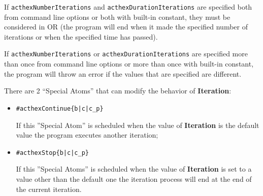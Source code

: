 \documentclass[a4paper, 11pt]{article}
\newcommand{\Iteration}{\textbf{Iteration}\xspace}
\begin{document}
		If \verb|acthexNumberIterations| and \verb|acthexDurationIterations| are specified both from command line options or both with built-in constant, they must be considered in OR (the program will end when it made ​​the specified number of iterations or when the specified time has passed).

		If \verb|acthexNumberIterations| or \verb|acthexDurationIterations| are specified more than once from command line options or more than once with built-in constant, the program will throw an error if the values that are specified are different.

		\vspace*{1em}

		There are 2 ``Special Atoms'' that can modify the behavior of \Iteration:
		\begin{itemize}
			\item \verb+#acthexContinue{b|c|c_p}+

				If this ''Special Atom'' is scheduled when the value of \Iteration is the default value the program executes another iteration;

			\item \verb+#acthexStop{b|c|c_p}+

				If this ''Special Atoms'' is scheduled when the value of \Iteration is set to a value other than the default one the iteration process will end at the end of the current iteration.
		\end{itemize}
\end{document}
